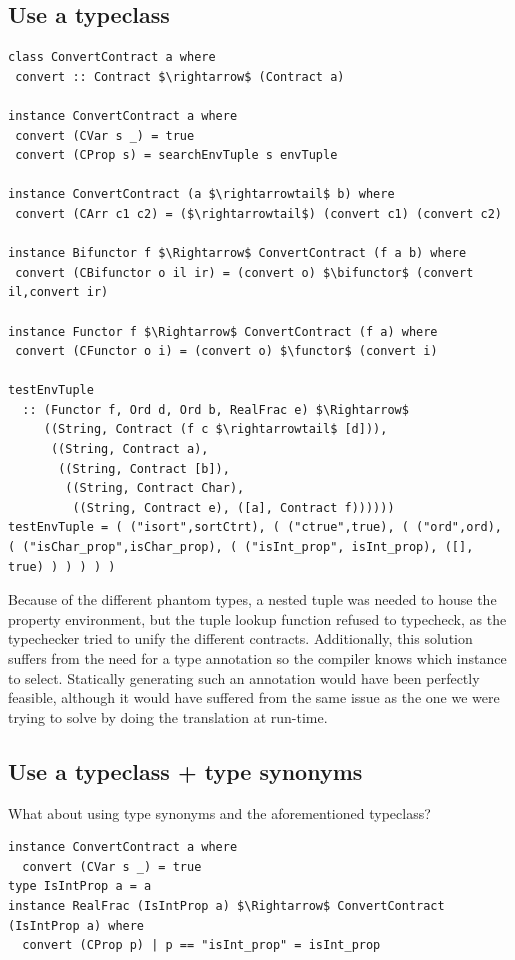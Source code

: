 \documentclass[10pt]{report}
\makeatletter
\newcommand{\functor}{<\!\!\!@\!\!\!>}
\newcommand{\bifunctor}{<\!\!\!@\!\!@\!\!\!>}
\makeatother
\begin{document}
{\subsection{Use a typeclass}

\begin{lstlisting}[caption=Attempt at using a typeclass to recover the extra type information.,mathescape]
class ConvertContract a where
 convert :: Contract $\rightarrow$ (Contract a)

instance ConvertContract a where
 convert (CVar s _) = true
 convert (CProp s) = searchEnvTuple s envTuple

instance ConvertContract (a $\rightarrowtail$ b) where
 convert (CArr c1 c2) = ($\rightarrowtail$) (convert c1) (convert c2)

instance Bifunctor f $\Rightarrow$ ConvertContract (f a b) where
 convert (CBifunctor o il ir) = (convert o) $\bifunctor$ (convert il,convert ir)

instance Functor f $\Rightarrow$ ConvertContract (f a) where
 convert (CFunctor o i) = (convert o) $\functor$ (convert i)
 
testEnvTuple
  :: (Functor f, Ord d, Ord b, RealFrac e) $\Rightarrow$
     ((String, Contract (f c $\rightarrowtail$ [d])),
      ((String, Contract a),
       ((String, Contract [b]),
        ((String, Contract Char),
         ((String, Contract e), ([a], Contract f))))))
testEnvTuple = ( ("isort",sortCtrt), ( ("ctrue",true), ( ("ord",ord), ( ("isChar_prop",isChar_prop), ( ("isInt_prop", isInt_prop), ([], true) ) ) ) ) )
\end{lstlisting}

Because of the different phantom types, a nested tuple was needed to house the property environment, but the tuple lookup function refused to typecheck, as the typechecker tried to unify the different contracts.
Additionally, this solution suffers from the need for a type annotation so the compiler knows which instance to select.
Statically generating such an annotation would have been perfectly feasible, although it would have suffered from the same issue as the one we were trying to solve by doing the translation at run-time.

\subsection{Use a typeclass + type synonyms}
What about using type synonyms and the aforementioned typeclass?

\begin{lstlisting}[caption=Attempt at using type synonyms to choose the correct instances.,mathescape]
instance ConvertContract a where
  convert (CVar s _) = true
type IsIntProp a = a
instance RealFrac (IsIntProp a) $\Rightarrow$ ConvertContract (IsIntProp a) where
  convert (CProp p) | p == "isInt_prop" = isInt_prop
\end{lstlisting}

}
\end{document}
